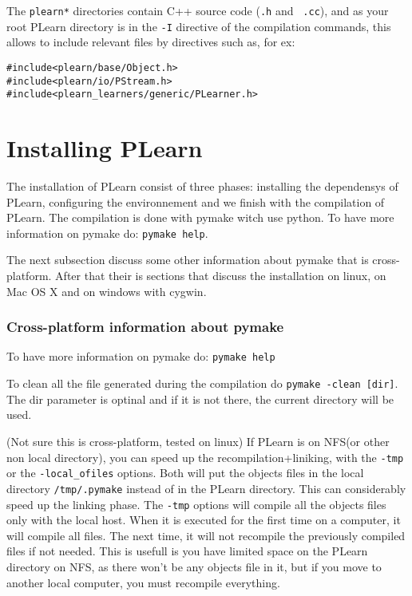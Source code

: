 \documentclass[11pt]{book}
\begin{document}
The \verb!plearn*! directories contain C++ source code ({\tt .h} and {\tt
  .cc}), and as your root PLearn directory is in the \verb!-I! directive of
the compilation commands, this allows to include relevant files by
directives such as, for ex:
\begin{verbatim}
#include<plearn/base/Object.h>
#include<plearn/io/PStream.h>
#include<plearn_learners/generic/PLearner.h>
\end{verbatim}



\chapter{Installing PLearn}

The installation of PLearn consist of three phases: installing the dependensys of PLearn, configuring the environnement and we finish with the compilation of PLearn. The compilation is done with pymake witch use python. To have more information on pymake do: \verb!pymake help!. 


The next subsection discuss some other information about pymake that is cross-platform. After that their is sections that discuss the installation on linux, on Mac OS X and on windows with cygwin.

\subsection{Cross-platform information about pymake}
To have more information on pymake do: \verb!pymake help!

To clean all the file generated during the compilation do \verb!pymake -clean [dir]!. The dir parameter is optinal and if it is not there, the current directory will be used.

(Not sure this is cross-platform, tested on linux)
If PLearn is on NFS(or other non local directory), you can speed up the
recompilation+liniking, with the \verb!-tmp! or the
\verb!-local_ofiles! options. Both will put the objects files in the
local directory \verb!/tmp/.pymake! instead of in the
PLearn directory. This can considerably speed up the linking phase. 
The \verb!-tmp! options will compile all the objects files only with the local host.
When it is executed for the first
time on a computer, it will compile all files. The next time, it will not recompile the 
previously compiled files if not needed. This is usefull is you have
limited space on the PLearn directory on NFS, as there won't be
any objects
file in it, but if you move to another local computer, you must recompile
everything.
\end{document}
